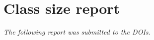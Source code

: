 \chapter{Class size report}\label{app:sec:classsize}
\emph{The following report was submitted to the DOIs}.


